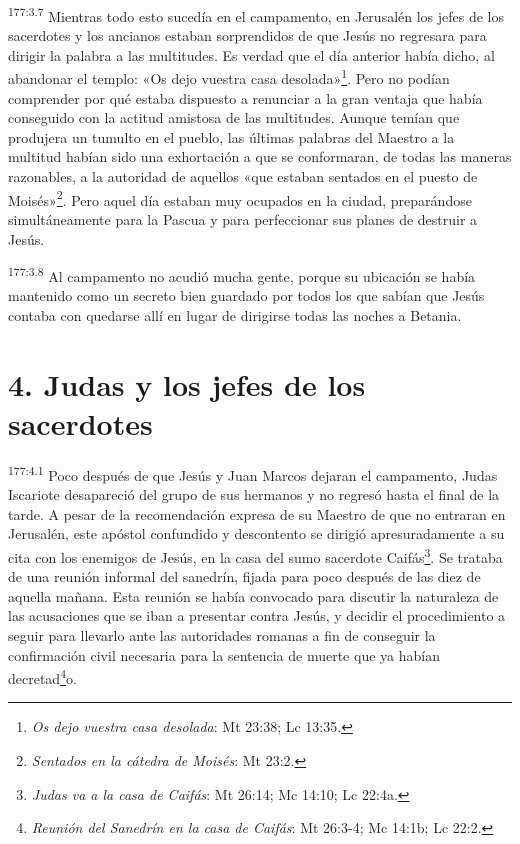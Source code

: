 \par 
\textsuperscript{177:3.7} Mientras todo esto sucedía en el campamento, en Jerusalén los jefes de los sacerdotes y los ancianos estaban sorprendidos de que Jesús no regresara para dirigir la palabra a las multitudes. Es verdad que el día anterior había dicho, al abandonar el templo: «Os dejo vuestra casa desolada»\footnote{\textit{Os dejo vuestra casa desolada}: Mt 23:38; Lc 13:35.}. Pero no podían comprender por qué estaba dispuesto a renunciar a la gran ventaja que había conseguido con la actitud amistosa de las multitudes. Aunque temían que produjera un tumulto en el pueblo, las últimas palabras del Maestro a la multitud habían sido una exhortación a que se conformaran, de todas las maneras razonables, a la autoridad de aquellos «que estaban sentados en el puesto de Moisés»\footnote{\textit{Sentados en la cátedra de Moisés}: Mt 23:2.}. Pero aquel día estaban muy ocupados en la ciudad, preparándose simultáneamente para la Pascua y para perfeccionar sus planes de destruir a Jesús.

\par 
\textsuperscript{177:3.8} Al campamento no acudió mucha gente, porque su ubicación se había mantenido como un secreto bien guardado por todos los que sabían que Jesús contaba con quedarse allí en lugar de dirigirse todas las noches a Betania.

\section*{4. Judas y los jefes de los sacerdotes}
\par 
\textsuperscript{177:4.1} Poco después de que Jesús y Juan Marcos dejaran el campamento, Judas Iscariote desapareció del grupo de sus hermanos y no regresó hasta el final de la tarde. A pesar de la recomendación expresa de su Maestro de que no entraran en Jerusalén, este apóstol confundido y descontento se dirigió apresuradamente a su cita con los enemigos de Jesús, en la casa del sumo sacerdote Caifás\footnote{\textit{Judas va a la casa de Caifás}: Mt 26:14; Mc 14:10; Lc 22:4a.}. Se trataba de una reunión informal del sanedrín, fijada para poco después de las diez de aquella mañana. Esta reunión se había convocado para discutir la naturaleza de las acusaciones que se iban a presentar contra Jesús, y decidir el procedimiento a seguir para llevarlo ante las autoridades romanas a fin de conseguir la confirmación civil necesaria para la sentencia de muerte que ya habían decretad\footnote{\textit{Reunión del Sanedrín en la casa de Caifás}: Mt 26:3-4; Mc 14:1b; Lc 22:2.}o.

